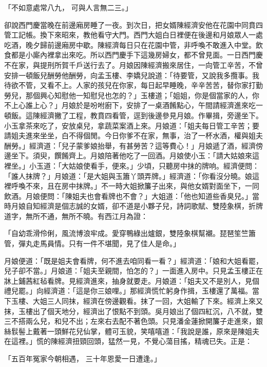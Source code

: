 \begin{showcontents}{}
「不如意處常八九，  可與人言無二三。」

卻說西門慶當晚在前邊廂房睡了一夜。到次日，把女婿陳經濟安他在花園中同賁四管工記帳。換下來昭來，教他看守大門。西門大姐白日裡便在後邊和月娘眾人一處吃酒，晚夕歸前邊廂房中歇。陳經濟每日只在花園中管，非呼喚不敢進入中堂。飲食都是小廝內裡拿出來吃。所以西門慶手下這幾房婦女，都不曾見面。一日西門慶不在家，與提刑所賀千戶送行去了。月娘因陳經濟搬來居住，一向管工辛苦，不曾安排一頓飯兒酬勞他酬勞，向孟玉樓、李嬌兒說道：「待要管，又說我多攬事。我待欲不管，又看不上。人家的孩兒在你家，每日起早睡晚，辛辛苦苦，替你家打勤勞兒，那個興心知慰他一知慰兒也怎的？」玉樓道；「姐姐，你是個當家的人，你不上心誰上心？」月娘於是吩咐廚下，安排了一桌酒餚點心，午間請經濟進來吃一頓飯。這陳經濟撇了工程，教賁四看管，逕到後邊參見月娘。作畢揖，旁邊坐下。小玉拿茶來吃了，安放桌兒，拿蔬菜案酒上來。月娘道：「姐夫每日管工辛苦；要請姐夫進來坐坐，白不得個閒。今日你爹不在家，無事，治了一杯水酒，權與姐夫酬勞。」經濟道：「兒子蒙爹娘抬舉，有甚勞苦？這等費心！」月娘遞了酒，經濟傍邊坐下。須臾，饌餚齊上。月娘陪著他吃了一回酒。月娘使小玉：「請大姑娘來這裡坐。」小玉道：「大姑娘使看手，便來。」少頃，只聽房中抹的牌响。經濟便問：「誰人抹牌？」月娘道：「是大姐與玉簫丫頭弄牌。」經濟道：「你看沒分曉。娘這裡呼喚不來，且在房中抹牌。」不一時大姐掀簾子出來，與他女婿對面坐下，一同飲酒。月娘便問：「陳姐夫也會看牌也不會？」大姐道：「他也知道些香臭兒。」當時月娘自知經濟是個志誠的女婿，卻不道是小夥子兒，詩詞歌賦、雙陸象棋，折牌道字，無所不通，無所不曉。有西江月為證：

「自幼乖滑伶俐，風流博浪牢成。愛穿鴨綠出爐銀，雙陸象棋幫襯。琵琶笙竺簫管，彈丸走馬員情。只有一件不堪聞，見了佳人是命。」

月娘便道：「既是姐夫會看牌，何不進去咱同看一看？」經濟道：「娘和大姐看罷，兒子卻不當。」月娘道：「姐夫至親間，怕怎的？」一面進入房中。只見孟玉樓正在牀上鋪茜紅毡看牌。見經濟進來，抽身就要走。月娘道：「姐夫又不是別人，見個禮兒罷。」向經濟道：「這是你三娘哩。」那經濟慌忙躬身作揖，玉樓還了萬福。當下玉樓、大姐三人同抹，經濟在傍邊觀看。抹了一回，大姐輸了下來。經濟上來又抹，玉樓出了個天地分，經濟出了恨點不到頭。吳月娘出了個四紅沉，八不就，雙三不搭兩么兒，和兒不出；左來右去配不著色頭。只見潘金蓮掀開簾子走進來，銀絲䯼髻上戴著一頭鮮花兒仙掌，體可玉貌，笑嘻嘻道：「我說是誰，原來是陳姐夫在這裡。」慌的陳經濟扭頸回頭，猛然一見，不覺心蕩目搖，精魂已失。正是：

「五百年冤家今朝相遇，  三十年恩愛一日遭逢。」


\end{showcontents}
